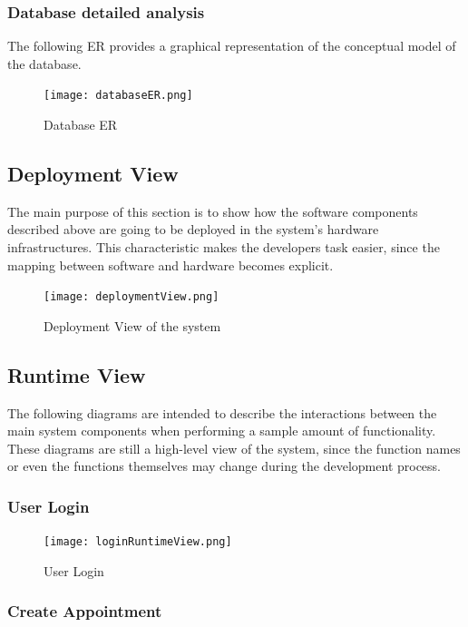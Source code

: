 \documentclass[12pt]{article}
\begin{document}
\subsubsection{Database detailed analysis}
The following ER provides a graphical representation of the conceptual model of the database.

\begin{figure}[H]
    \centering
    \texttt{[image: databaseER.png]}
    \caption{Database ER}
    \label{fig:databaseER}
\end{figure}

\subsection{Deployment View}
The main purpose of this section is to show how the software components described above are going to be deployed in the system's hardware infrastructures. This characteristic makes the developers task easier, since the mapping between software and hardware becomes explicit.

\begin{figure}[H]
    \centering
    \texttt{[image: deploymentView.png]}
    \caption{Deployment View of the system}
    \label{fig:componentView}
\end{figure}


\subsection{Runtime View}
The following diagrams are intended to describe the interactions between the main system components when performing a sample amount of functionality. These diagrams are still a high-level view of the system, since the function names or even the functions themselves may change during the development process.
\subsubsection{User Login}

\begin{figure}[H]
    \centering
    \texttt{[image: loginRuntimeView.png]}
    \caption{User Login}
    \label{fig:loginRuntime}
\end{figure}

\subsubsection{Create Appointment}
\end{document}

